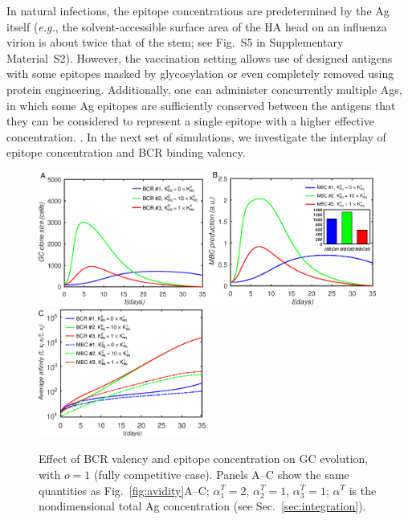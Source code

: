 \documentclass[utf8]{frontiersHLTH}%
\def\eg {{\it e.g.}}
\newcommand{\fig}[1]{Fig.~\ref{fig:#1}}
\newcommand{\Sec}[1]{Sec.~\ref{sec:#1}}
\renewcommand{\sec}[1]{\Sec{#1}}
\newcommand{\SI}{Supplementary Material}
\newcommand{\hfig}[1]{#1} %
\begin{document}
In natural infections, the epitope concentrations are predetermined by the Ag itself (\eg,
the solvent-accessible surface area of the HA head on an influenza virion
is about twice that of the stem; see Fig.~S5 in \SI~S2).
%
However, the vaccination setting allows use of designed antigens with
some epitopes masked by glycosylation\cite{bajic19,eggink14,zhou17} or
even completely removed using protein engineering\cite{yassine15,corbett19}. Additionally, one can
administer concurrently multiple Ags, in which some Ag epitopes are
sufficiently conserved between the antigens that they can be considered
to represent a single epitope with a higher effective concentration.
\cite{kanekiyo19,Boyoglu-Barnum20,cohen21,glanville20}.
In the next set of simulations, we investigate the interplay of epitope
concentration and BCR binding valency.
%
\hfig{
\begin{figure}
\centering
\includegraphics[width=0.49\textwidth]{../fig7/gcsize.eps}
\includegraphics[width=0.49\textwidth]{../fig7/dmbc.eps}
\includegraphics[width=0.49\textwidth]{../fig7/A.eps}
\caption{Effect of BCR valency and epitope concentration on GC evolution, with $o=1$ (fully competitive case).
Panels A--C show the same quantities as \fig{avidity}A--C;
$\alpha_1^T=2$, $\alpha_2^T=1$, $\alpha_3^T=1$; $\alpha^T$ is the nondimensional total Ag concentration (see \sec{integration}).
}
\label{fig:agc1}
\end{figure}
}
\end{document}

